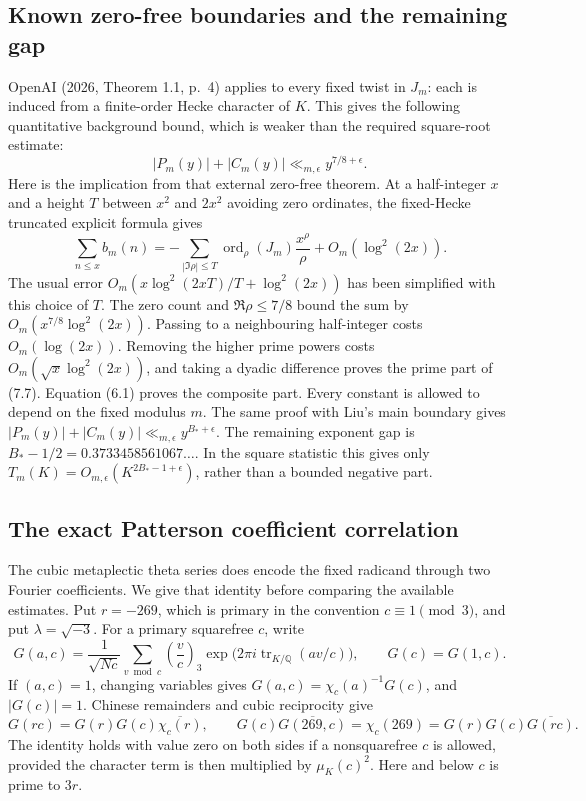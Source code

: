 \documentclass[11pt]{article}
\newcommand{\Q}{\mathbb Q}
\newcommand{\tr}{\operatorname{tr}}
\newcommand{\ord}{\operatorname{ord}}
\begin{document}
\subsection{Known zero-free boundaries and the remaining gap}
OpenAI (2026, Theorem 1.1, p.~4) applies to every fixed twist in $J_m$: each is induced from a finite-order Hecke character of $K$. This gives the following quantitative background bound, which is weaker than the required square-root estimate:
\[
 |P_m(y)|+|C_m(y)|\ll_{m,\epsilon}y^{7/8+\epsilon}.
 \tag{7.7}
\]
Here is the implication from that external zero-free theorem. At a half-integer $x$ and a height $T$ between $x^2$ and $2x^2$ avoiding zero ordinates, the fixed-Hecke truncated explicit formula gives
\[
 \sum_{n\le x}b_m(n)
   =-\sum_{|\Im\rho|\le T}\ord_\rho(J_m)\frac{x^\rho}{\rho}
      +O_m(\log^2(2x)).
\]
The usual error $O_m(x\log^2(2xT)/T+\log^2(2x))$ has been simplified with this choice of $T$. The zero count and $\Re\rho\le7/8$ bound the sum by $O_m(x^{7/8}\log^2(2x))$. Passing to a neighbouring half-integer costs $O_m(\log(2x))$. Removing the higher prime powers costs $O_m(\sqrt x\log^2(2x))$, and taking a dyadic difference proves the prime part of (7.7). Equation (6.1) proves the composite part. Every constant is allowed to depend on the fixed modulus $m$. The same proof with Liu's main boundary gives $|P_m(y)|+|C_m(y)|\ll_{m,\epsilon}y^{B_*+\epsilon}$. The remaining exponent gap is $B_*-1/2=0.3733458561067\ldots$. In the square statistic this gives only $T_m(K)=O_{m,\epsilon}(K^{2B_*-1+\epsilon})$, rather than a bounded negative part.

\subsection{The exact Patterson coefficient correlation}
The cubic metaplectic theta series does encode the fixed radicand through two Fourier coefficients. We give that identity before comparing the available estimates. Put $r=-269$, which is primary in the convention $c\equiv1\pmod3$, and put $\lambda=\sqrt{-3}$. For a primary squarefree $c$, write
\[
 G(a,c)=\frac1{\sqrt{Nc}}\sum_{v\bmod c}\left(\frac vc\right)_3
       \exp\bigl(2\pi i\tr_{K/\Q}(av/c)\bigr),\qquad G(c)=G(1,c).
\]
If $(a,c)=1$, changing variables gives $G(a,c)=\chi_c(a)^{-1}G(c)$, and $|G(c)|=1$. Chinese remainders and cubic reciprocity give
\[
 G(rc)=G(r)G(c)\overline{\chi_c(r)},\qquad
 G(c)\overline{G(269,c)}=\chi_c(269)
       =G(r)G(c)\overline{G(rc)}.
 \tag{7.8}
\]
The identity holds with value zero on both sides if a nonsquarefree $c$ is allowed, provided the character term is then multiplied by $\mu_K(c)^2$. Here and below $c$ is prime to $3r$.
\end{document}
